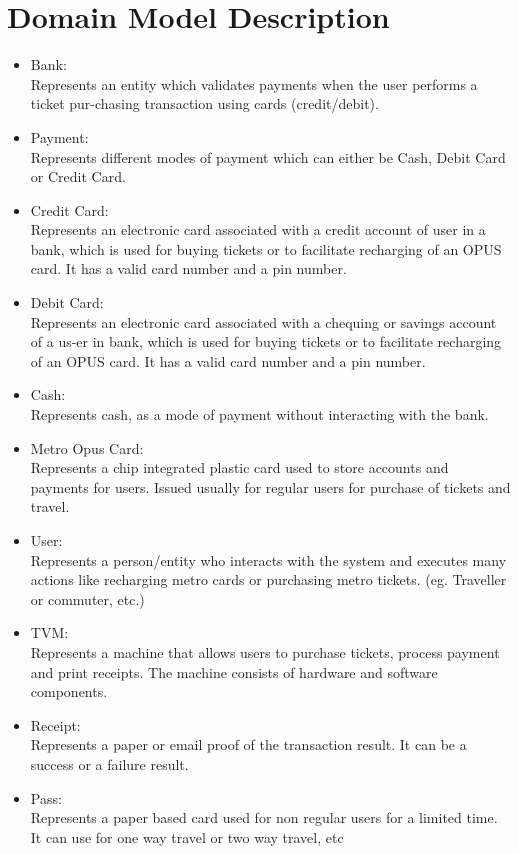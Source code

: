 \documentclass[11pt,oneside]{book}
\begin{document}
\section{Domain Model Description }

\begin{itemize}
\item Bank: \\ Represents an entity which validates payments when the user performs a ticket pur-chasing transaction using cards (credit/debit). 

\item Payment:\\ 
 Represents different modes of payment which can either be Cash, Debit Card or Credit Card.

\item Credit Card: \\
Represents an electronic card associated with a credit account of user in a bank, which is used for buying tickets or to facilitate recharging of an OPUS card. It has a valid card number and a pin number. 

\item Debit Card: \\
 Represents an electronic card associated with a chequing or savings account of a us-er in bank, which is used for buying tickets or to facilitate recharging of an OPUS card. It has a valid card number and a pin number. 

\item Cash:\\
Represents cash, as a mode of payment without interacting with the bank. 

\item Metro Opus Card:\\
 Represents a chip integrated plastic card used to store accounts and payments for users. Issued usually for regular users for purchase of tickets and travel. 

\item User:\\
 Represents a person/entity who interacts with the system and executes many actions like recharging metro cards or purchasing metro tickets. (eg. Traveller or commuter, etc.)

\item TVM: \\
Represents a machine that allows users to purchase tickets, process payment 
and print receipts. The machine consists of hardware and software components. 

\item Receipt: \\ 
 Represents a paper or email proof of the transaction result. It can be a success 
or a failure result.

\item Pass: \\
 Represents a paper based card used for non regular users for a limited time. 
It can use for one way travel or two way travel, etc



\end{itemize}
\end{document}
